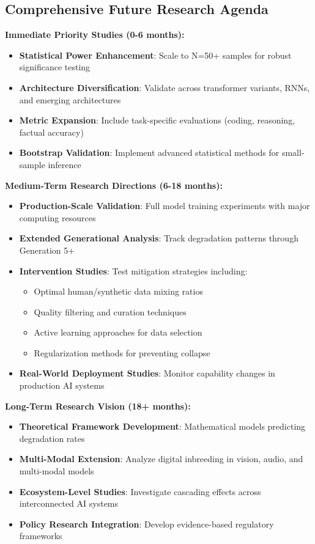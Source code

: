 \documentclass{article}
\begin{document}
\subsection{Comprehensive Future Research Agenda}

\textbf{Immediate Priority Studies (0-6 months):}
\begin{itemize}
    \item \textbf{Statistical Power Enhancement}: Scale to N=50+ samples for robust significance testing
    \item \textbf{Architecture Diversification}: Validate across transformer variants, RNNs, and emerging architectures
    \item \textbf{Metric Expansion}: Include task-specific evaluations (coding, reasoning, factual accuracy)
    \item \textbf{Bootstrap Validation}: Implement advanced statistical methods for small-sample inference
\end{itemize}

\textbf{Medium-Term Research Directions (6-18 months):}
\begin{itemize}
    \item \textbf{Production-Scale Validation}: Full model training experiments with major computing resources
    \item \textbf{Extended Generational Analysis}: Track degradation patterns through Generation 5+
    \item \textbf{Intervention Studies}: Test mitigation strategies including:
    \begin{itemize}
        \item Optimal human/synthetic data mixing ratios
        \item Quality filtering and curation techniques
        \item Active learning approaches for data selection
        \item Regularization methods for preventing collapse
    \end{itemize}
    \item \textbf{Real-World Deployment Studies}: Monitor capability changes in production AI systems
\end{itemize}

\textbf{Long-Term Research Vision (18+ months):}
\begin{itemize}
    \item \textbf{Theoretical Framework Development}: Mathematical models predicting degradation rates
    \item \textbf{Multi-Modal Extension}: Analyze digital inbreeding in vision, audio, and multi-modal models
    \item \textbf{Ecosystem-Level Studies}: Investigate cascading effects across interconnected AI systems
    \item \textbf{Policy Research Integration}: Develop evidence-based regulatory frameworks
\end{itemize}
\end{document}
